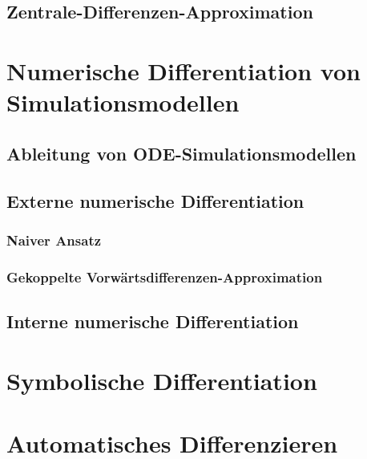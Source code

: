 		\subsection{Zentrale-Differenzen-Approximation} %

	\section{Numerische Differentiation von Simulationsmodellen} %

		\subsection{Ableitung von ODE-Simulationsmodellen} %

		\subsection{Externe numerische Differentiation} %

			\subsubsection{Naiver Ansatz} %

			\subsubsection{Gekoppelte Vorwärtsdifferenzen-Approximation} %

		\subsection{Interne numerische Differentiation} %

	\section{Symbolische Differentiation} %

	\section{Automatisches Differenzieren} %

